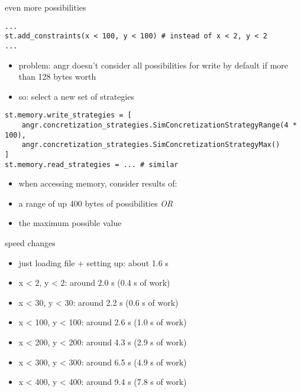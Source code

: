 \begin{frame}[fragile]{even more possibilities}
\begin{Verbatim}[fontsize=\fontsize{9}{10}]
...
st.add_constraints(x < 100, y < 100) # instead of x < 2, y < 2
...
\end{Verbatim}
\begin{itemize}
\item problem: angr doesn't consider all possibilities for write by default if more
    than 128 bytes worth
\item so: select a new set of strategies
\end{itemize}
\begin{Verbatim}[fontsize=\fontsize{8}{9}]
st.memory.write_strategies = [
    angr.concretization_strategies.SimConcretizationStrategyRange(4 * 100),
    angr.concretization_strategies.SimConcretizationStrategyMax()
]
st.memory.read_strategies = ... # similar
\end{Verbatim}
\begin{itemize}
\item when accessing memory, consider results of:
\item a range of up 400 bytes of possibilities \textit{OR}
\item the maximum possible value
\end{itemize}
\end{frame}

\begin{frame}{speed changes}
\begin{itemize}
\item just loading file + setting up: about 1.6 s
\item x < 2, y < 2: around 2.0 s (0.4 s of work)
\item x < 30, y < 30: around 2.2 s (0.6 s of work)
\item x < 100, y < 100: around 2.6 s (1.0 s of work)
\item x < 200, y < 200: around 4.3 s (2.9 s of work)
\item x < 300, y < 300: around 6.5 s (4.9 s of work)
\item x < 400, y < 400: around 9.4 s (7.8 s of work)
\end{itemize}
\end{frame}



